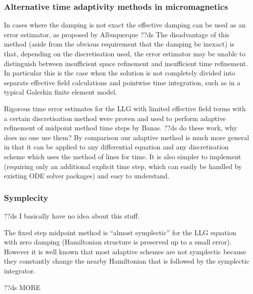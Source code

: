\subsubsection{Alternative time adaptivity methods in micromagnetics}
\label{sec:altern-time-adapt}

In cases where the damping is not exact the effective damping can be used as an error estimator, as proposed by Albuquerque \etal\cite{Albuquerque2001}
??ds The disadvantage of this method (aside from the obvious requirement that the damping be inexact) is that, depending on the discretisation used, the error estimator may be unable to distinguish between insufficient space refinement and insufficient time refinement.
In particular this is the case when the solution is not completely divided into separate effective field calculations and pointwise time integration, such as in a typical Galerkin finite element model.

Rigorous time error estimates for the LLG with limited effective field terms with a certain discretisation method were proven and used to perform adaptive refinement of midpoint method time steps by Banas.\cite{Banas-thesis}
??ds do these work, why does no one use them?
By comparison our adaptive method is much more general in that it can be applied to any differential equation and any discretisation scheme which uses the method of lines for time.
It is also simpler to implement (requiring only an additional explicit time step, which can easily be handled by existing ODE solver packages) and easy to understand.

\subsubsection{Symplecity}

??ds I basically have no idea about this stuff.

The fixed step midpoint method is ``almost symplectic'' for the LLG equation with zero damping (Hamiltonian structure is preserved up to a small error).\cite{Austin1993}
However it is well known that most adaptive schemes are not symplectic\cite{Iserles2009} %
because they constantly change the nearby Hamiltonian that is followed by the symplectic integrator.

??ds MORE



